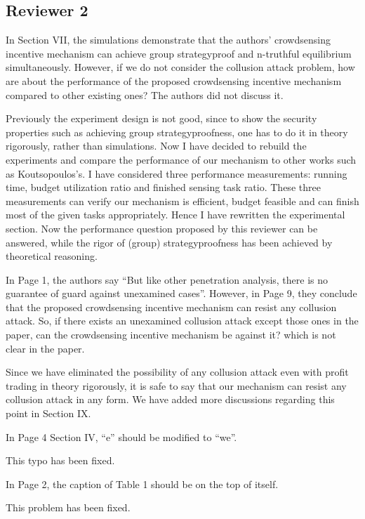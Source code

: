 \documentclass[a4paper,11pt]{exam}
\begin{document}
\begin{questions}
\section{Reviewer 2}
\question In Section VII, the simulations demonstrate that the authors’ crowdsensing incentive mechanism can achieve group strategyproof and n-truthful equilibrium simultaneously. However, if we do not consider the collusion attack problem, how are about the performance of the proposed crowdsensing incentive mechanism compared to other existing ones? The authors did not discuss it.  
\begin{solution}
Previously the experiment design is not good, since to show the security properties such as achieving group strategyproofness, one has to do it in theory rigorously, rather than simulations. Now I have decided to rebuild the experiments and compare the performance of our mechanism to other works such as Koutsopoulos's. I have considered three performance measurements: running time, budget utilization ratio and finished sensing task ratio. These three measurements can verify our mechanism is efficient, budget feasible and can finish most of the given tasks appropriately. Hence I have rewritten the experimental section. Now the performance question proposed by this reviewer can be answered, while the rigor of (group) strategyproofness has been achieved by theoretical reasoning.
\end{solution}

\question In Page 1, the authors say “But like other penetration analysis, there is no guarantee of guard against unexamined cases”. However, in Page 9, they conclude that the proposed crowdsensing incentive mechanism can resist any collusion attack. So, if there exists an unexamined collusion attack except those ones in the paper, can the  crowdsensing incentive mechanism be against it?  which is not clear in the paper.
\begin{solution}
Since we have eliminated the possibility of any collusion attack even with profit trading in theory rigorously, it is safe to say that our mechanism can resist any collusion attack in any form. 
We have added more discussions regarding this point in Section IX.
\end{solution}

\question In Page 4 Section IV, “e” should be modified to “we”.
\begin{solution}
This typo has been fixed.
\end{solution}

\question In Page 2, the caption of Table 1  should be on the top of itself.
\begin{solution}
This problem has been fixed.
\end{solution}


\end{questions}
\end{document}
